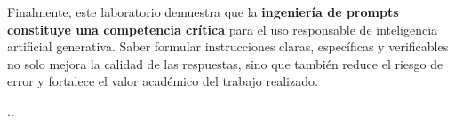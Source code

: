 \documentclass[11pt,a4paper]{article}
\begin{document}
Finalmente, este laboratorio demuestra que la \textbf{ingeniería de prompts constituye una competencia crítica} para el uso responsable de inteligencia artificial generativa. Saber formular instrucciones claras, específicas y verificables no solo mejora la calidad de las respuestas, sino que también reduce el riesgo de error y fortalece el valor académico del trabajo realizado.

..
\end{document}
